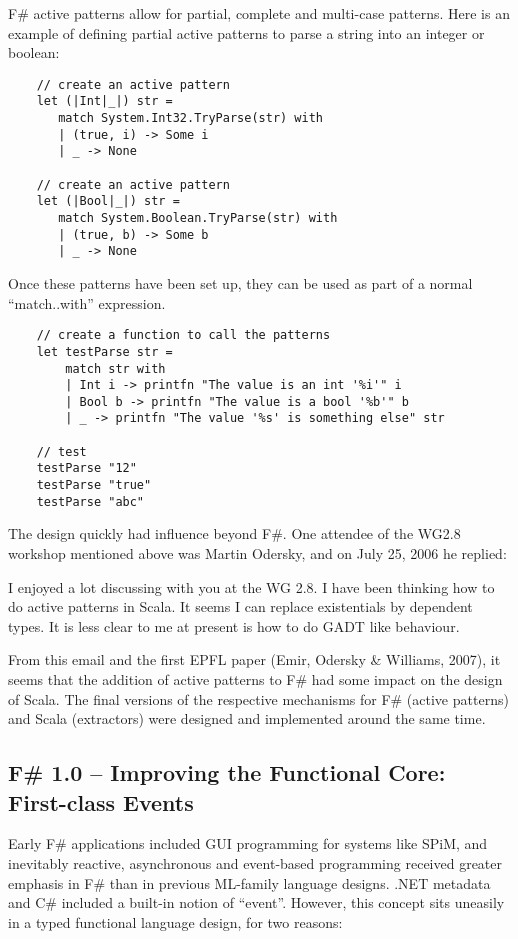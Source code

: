 \documentclass[acmsmall,review]{acmart}\settopmatter{printfolios=true,printccs=false,printacmref=false}
\begin{document}
F\# active patterns allow for partial, complete and multi-case patterns. Here is an example of defining partial active patterns to parse a string into an integer or boolean:

\begin{verbatim}
    // create an active pattern
    let (|Int|_|) str =
       match System.Int32.TryParse(str) with
       | (true, i) -> Some i
       | _ -> None

    // create an active pattern
    let (|Bool|_|) str =
       match System.Boolean.TryParse(str) with
       | (true, b) -> Some b
       | _ -> None
\end{verbatim}
Once these patterns have been set up, they can be used as part of a normal “match..with” expression.

\begin{verbatim}
    // create a function to call the patterns
    let testParse str = 
        match str with
        | Int i -> printfn "The value is an int '%i'" i
        | Bool b -> printfn "The value is a bool '%b'" b
        | _ -> printfn "The value '%s' is something else" str

    // test
    testParse "12"
    testParse "true"
    testParse "abc"
\end{verbatim}

The design quickly had influence beyond F\#. One attendee of the WG2.8 workshop mentioned above was Martin Odersky, and on July 25, 2006 he replied:

\begin{verbquote}
I enjoyed a lot discussing with you at the WG 2.8. I have been thinking how to do active patterns in Scala. It seems I can replace existentials by dependent types. It is less clear to me at present is how to do GADT like behaviour. 
\end{verbquote}


From this email and the first EPFL paper (Emir, Odersky \& Williams, 2007), it seems that the addition of active patterns to F\# had some impact on the design of Scala. The final versions of the respective mechanisms for F\# (active patterns) and Scala (extractors) were designed and implemented around the same time.    


\subsection*{F\# 1.0 – Improving the Functional Core: First-class Events}

Early F\# applications included GUI programming for systems like SPiM, and inevitably reactive, asynchronous and event-based programming received greater emphasis in F\# than in previous ML-family language designs. .NET metadata and C\# included a built-in notion of “event”. However, this concept sits uneasily in a typed functional language design, for two reasons:
\end{document}
